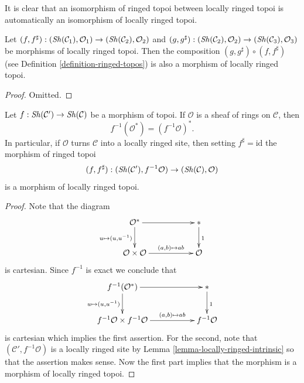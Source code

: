\noindent
It is clear that an isomorphism of ringed topoi between locally ringed
topoi is automatically an isomorphism of locally ringed topoi.

\begin{lemma}
\label{lemma-composition-morphisms-locally-ringed-topoi}
Let
$(f, f^\sharp) :
(\mathop{\mathit{Sh}}\nolimits(\mathcal{C}_1), \mathcal{O}_1)
\to (\mathop{\mathit{Sh}}\nolimits(\mathcal{C}_2), \mathcal{O}_2)$ and
$(g, g^\sharp) :
(\mathop{\mathit{Sh}}\nolimits(\mathcal{C}_2), \mathcal{O}_2) \to
(\mathop{\mathit{Sh}}\nolimits(\mathcal{C}_3), \mathcal{O}_3)$
be morphisms of locally ringed topoi. Then the composition
$(g, g^\sharp) \circ (f, f^\sharp)$ (see
Definition \ref{definition-ringed-topos})
is also a morphism of locally ringed topoi.
\end{lemma}

\begin{proof}
Omitted.
\end{proof}

\begin{lemma}
\label{lemma-locally-ringed-intrinsic-morphism}
Let $f : \mathop{\mathit{Sh}}\nolimits(\mathcal{C}') \to \mathop{\mathit{Sh}}\nolimits(\mathcal{C})$
be a morphism of topoi. If $\mathcal{O}$ is a sheaf of rings
on $\mathcal{C}$, then
$$
f^{-1}(\mathcal{O}^*) = (f^{-1}\mathcal{O})^*.
$$
In particular, if $\mathcal{O}$ turns $\mathcal{C}$ into a locally
ringed site, then setting $f^\sharp = \text{id}$
the morphism of ringed topoi
$$
(f, f^\sharp) :
(\mathop{\mathit{Sh}}\nolimits(\mathcal{C}'), f^{-1}\mathcal{O})
\to
(\mathop{\mathit{Sh}}\nolimits(\mathcal{C}), \mathcal{O})
$$
is a morphism of locally ringed topoi.
\end{lemma}

\begin{proof}
Note that the diagram
$$
\xymatrix{
\mathcal{O}^* \ar[rr] \ar[d]_{u \mapsto (u, u^{-1})} & &
{*} \ar[d]^{1} \\
\mathcal{O} \times \mathcal{O} \ar[rr]^-{(a, b) \mapsto ab} & &
\mathcal{O}
}
$$
is cartesian. Since $f^{-1}$ is exact we conclude that
$$
\xymatrix{
f^{-1}(\mathcal{O}^*)
\ar[d]_{u \mapsto (u, u^{-1})} \ar[rr] & &
{*} \ar[d]^{1} \\
f^{-1}\mathcal{O} \times f^{-1}\mathcal{O} \ar[rr]^-{(a, b) \mapsto ab} & &
f^{-1}\mathcal{O}
}
$$
is cartesian which implies the first assertion. For the second,
note that $(\mathcal{C}', f^{-1}\mathcal{O})$ is a locally ringed site
by
Lemma \ref{lemma-locally-ringed-intrinsic}
so that the assertion makes sense. Now the first part implies that
the morphism is a morphism of locally ringed topoi.
\end{proof}

